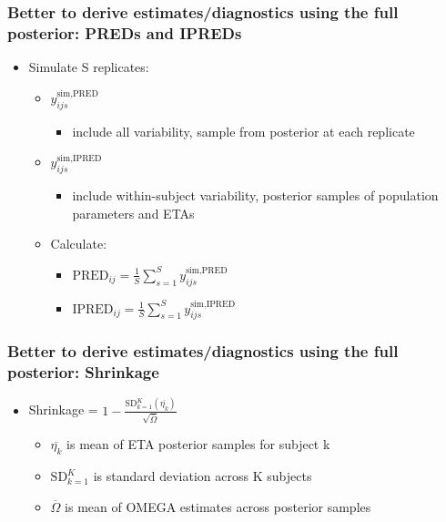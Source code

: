 \documentclass[handout]{beamer}
\begin{document}
\begin{frame}
  \frametitle{Better to derive estimates/diagnostics using the full posterior: PREDs and IPREDs}

\begin{itemize}
  \item Simulate S replicates:
        \begin{itemize}
          \item $y_{ijs}^{\text{sim,PRED}}$
                \begin{itemize}
                  \item include all variability, sample from posterior at each replicate
                \end{itemize}
          \item $y_{ijs}^{\text{sim,IPRED}}$
                \begin{itemize}
                  \item include within-subject variability, posterior samples of population parameters and ETAs
                \end{itemize}
        \end{itemize}
        \begin{itemize}
          \item Calculate:
                \begin{itemize}
                  \item $\text{PRED}_{ij} = \frac{1}{S} \sum_{s=1}^{S} y_{ijs}^{\text{sim,PRED}}$
                  \item $\text{IPRED}_{ij} = \frac{1}{S} \sum_{s=1}^{S} y_{ijs}^{\text{sim,IPRED}}$
                \end{itemize}
        \end{itemize}
\end{itemize}

\end{frame}

\begin{frame}
  \frametitle{Better to derive estimates/diagnostics using the full posterior: Shrinkage}

\begin{itemize}
  \item Shrinkage = $1 - \frac{\text{SD}_{k=1}^K(\overline{\eta_k})}{\sqrt{\overline{\Omega}}}$
        \begin{itemize}
                \item $\overline{\eta_k}$ is mean of ETA posterior samples for subject k
                \item $\text{SD}_{k=1}^K$ is standard deviation across K subjects
                \item $\overline{\Omega}$ is mean of OMEGA estimates across posterior samples
        \end{itemize}
\end{itemize}

\end{frame}
\end{document}
